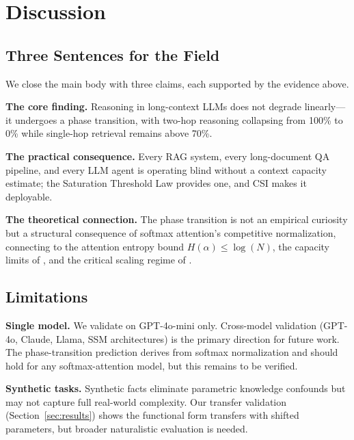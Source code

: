 \documentclass{article}
\begin{document}
\section{Discussion}
\label{sec:discussion}

\subsection{Three Sentences for the Field}

We close the main body with three claims, each supported by the evidence above.

\begin{tcolorbox}[colback=gray!5!white,colframe=gray!70!black]
\textbf{The core finding.}
Reasoning in long-context LLMs does not degrade linearly---it undergoes a phase transition, with two-hop reasoning collapsing from 100\% to 0\% while single-hop retrieval remains above 70\%.

\medskip
\textbf{The practical consequence.}
Every RAG system, every long-document QA pipeline, and every LLM agent is operating blind without a context capacity estimate; the Saturation Threshold Law provides one, and CSI makes it deployable.

\medskip
\textbf{The theoretical connection.}
The phase transition is not an empirical curiosity but a structural consequence of softmax attention's competitive normalization, connecting to the attention entropy bound $H(\alpha) \leq \log(N)$, the capacity limits of \citet{adler2025capacity}, and the critical scaling regime of \citet{polyak2025critical}.
\end{tcolorbox}

\subsection{Limitations}

\textbf{Single model.} We validate on GPT-4o-mini only. Cross-model validation (GPT-4o, Claude, Llama, SSM architectures) is the primary direction for future work. The phase-transition prediction derives from softmax normalization and should hold for any softmax-attention model, but this remains to be verified.

\textbf{Synthetic tasks.} Synthetic facts eliminate parametric knowledge confounds but may not capture full real-world complexity. Our transfer validation (Section~\ref{sec:results}) shows the functional form transfers with shifted parameters, but broader naturalistic evaluation is needed.
\end{document}
